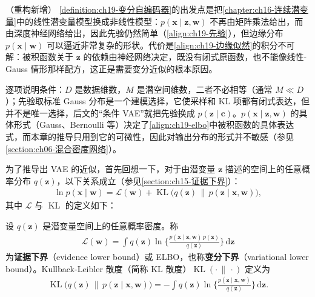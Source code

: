 \documentclass[../../main.tex]{subfiles}
\begin{document}
\begin{remark}（重构新增）
\cref{definition:ch19-变分自编码器}的出发点是把\cref{chapter:ch16-连续潜变量}中的线性潜变量模型换成非线性模型：$p(\bm{x}\mid\bm{z},\bm{w})$ 不再由矩阵乘法给出，而由深度神经网络给出，因此先验仍然简单（\eqref{align:ch19-先验}），但边缘分布 $p(\bm{x}\mid\bm{w})$ 可以逼近非常复杂的形状。代价是\eqref{align:ch19-边缘似然}的积分不可解：被积函数关于 $\bm{z}$ 的依赖由神经网络决定，既没有闭式原函数，也不能像线性-Gauss 情形那样配方，这正是需要变分近似的根本原因。

逐项说明条件：$D$ 是数据维数，$M$ 是潜空间维数，二者不必相等（通常 $M\ll D$）；先验取标准 Gauss 分布是一个建模选择，它使采样和 KL 项都有闭式表达，但并不是唯一选择，后文的“条件 VAE”就把先验换成 $p(\bm{z}\mid\bm{c})$。$p(\bm{x}\mid\bm{z},\bm{w})$ 的具体形式（Gauss、Bernoulli 等）决定了\eqref{align:ch19-elbo}中被积函数的具体表达式，而本章的推导只用到它的可微性，因此对输出分布的形式并不敏感（参见\cref{section:ch06-混合密度网络}）。
\end{remark}

为了推导出 VAE 的近似，首先回想一下，对于由潜变量 $\bm{z}$ 描述的空间上的任意概率分布 $q(\bm{z})$，以下关系成立（参见\cref{section:ch15-证据下界}）：
\begin{align}
\ln p(\bm{x}\mid\bm{w})=\mathcal{L}(\bm{w})+\operatorname{KL}\big(q(\bm{z})\,\|\,p(\bm{z}\mid\bm{x},\bm{w})\big),
\label{align:ch19-elbo分解}
\end{align}
其中 $\mathcal{L}$ 与 $\operatorname{KL}$ 的定义如下：

\begin{definition}[证据下界与 KL 散度]\label{definition:ch19-证据下界}
设 $q(\bm{z})$ 是潜变量空间上的任意概率密度。称
\begin{align}
\mathcal{L}(\bm{w})=\int q(\bm{z})\ln\Big\{\frac{p(\bm{x}\mid\bm{z},\bm{w})\,p(\bm{z})}{q(\bm{z})}\Big\}\,\mathrm{d}\bm{z}
\label{align:ch19-elbo}
\end{align}
为\textbf{证据下界}（evidence lower bound）或 ELBO，也称\textbf{变分下界}（variational lower bound）。Kullback-Leibler 散度（简称 KL 散度）$\operatorname{KL}(\cdot\,\|\,\cdot)$ 定义为
\begin{align}
\operatorname{KL}\big(q(\bm{z})\,\|\,p(\bm{z}\mid\bm{x},\bm{w})\big)=-\int q(\bm{z})\ln\Big\{\frac{p(\bm{z}\mid\bm{x},\bm{w})}{q(\bm{z})}\Big\}\,\mathrm{d}\bm{z}.
\label{align:ch19-kl}
\end{align}
\end{definition}
\end{document}
